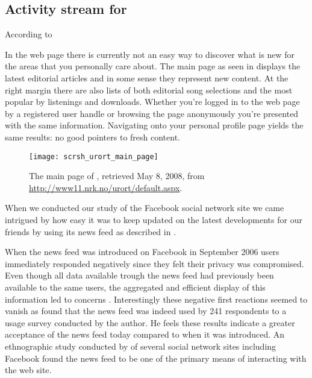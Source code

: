 \subsection{Activity stream for \urort{}}
\label{section:implementation.design.activity.stream}

According to 

In the \urort{} web page there is currently not an easy way to discover what
is new for the areas that you personally care about. The main page
as seen in 
displays the latest editorial articles and in some sense they represent
new content. At the right margin there are also lists of both editorial song
selections and the most popular by listenings and downloads. Whether you're
logged in to the web page by a registered user handle or browsing the page
anonymously you're presented with the same information. Navigating onto your
personal profile page yields the same results: no good pointers to fresh
content.

\begin{figure}
  \begin{whole}
    \texttt{[image: scrsh\_urort\_main\_page]}
    \caption[\urort{} Main Page]{
      The main page of \urort{},
      retrieved May 8, 2008, from
      \url{http://www11.nrk.no/urort/default.aspx}.
    }
    \label{figure:scrsh.urort.main.page}
  \end{whole}
\end{figure}

When we conducted our study of the Facebook social network site we came
intrigued by how easy it was to keep updated on the latest developments for
our friends by using its news feed as described in
. 

When the news feed was introduced on Facebook in September 2006 users
immediately responded negatively since they felt their privacy was
compromised. Even though all data available trough the news feed had
previously been available to the same users, the aggregated and efficient
display of this information led to concerns \citet[]{boyd08}. 
Interestingly these negative first reactions seemed to vanish as
\citet[]{joinson08} found that the news feed was indeed used by
241 respondents to a usage survey conducted by the author. He feels these
results indicate a greater acceptance of the news feed today compared to when
it was introduced. An ethnographic study conducted by
\citet[]{chapman08} of several social network sites
including Facebook found the news feed to be one of the primary means of
interacting with the web site.

